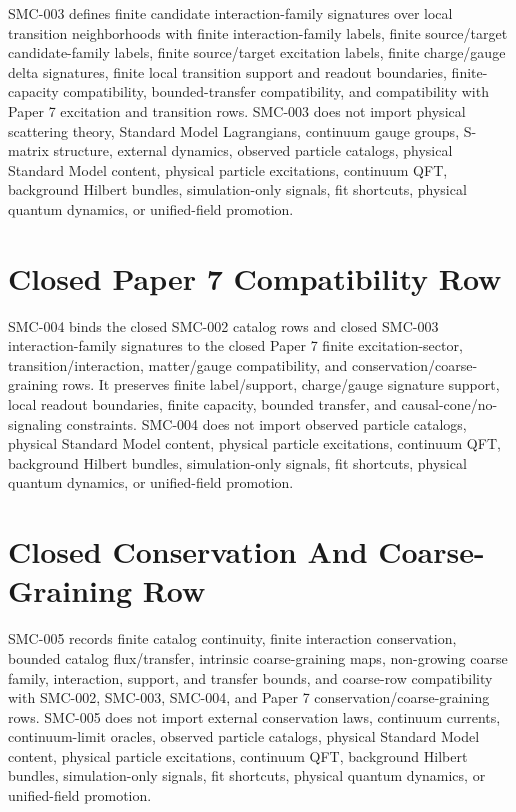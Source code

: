 \documentclass{article}
\begin{document}
SMC-003 defines finite candidate interaction-family signatures over local
transition neighborhoods with finite interaction-family labels, finite
source/target candidate-family labels, finite source/target excitation
labels, finite charge/gauge delta signatures, finite local transition support
and readout boundaries, finite-capacity compatibility, bounded-transfer
compatibility, and compatibility with Paper 7 excitation and transition rows.
SMC-003 does not import physical scattering theory, Standard Model
Lagrangians, continuum gauge groups, S-matrix structure, external dynamics,
observed particle catalogs, physical Standard Model content, physical
particle excitations, continuum QFT, background Hilbert bundles,
simulation-only signals, fit shortcuts, physical quantum dynamics, or
unified-field promotion.

\section{Closed Paper 7 Compatibility Row}

SMC-004 binds the closed SMC-002 catalog rows and closed SMC-003
interaction-family signatures to the closed Paper 7 finite excitation-sector,
transition/interaction, matter/gauge compatibility, and
conservation/coarse-graining rows. It preserves finite label/support,
charge/gauge signature support, local readout boundaries, finite capacity,
bounded transfer, and causal-cone/no-signaling constraints. SMC-004 does not
import observed particle catalogs, physical Standard Model content, physical
particle excitations, continuum QFT, background Hilbert bundles,
simulation-only signals, fit shortcuts, physical quantum dynamics, or
unified-field promotion.

\section{Closed Conservation And Coarse-Graining Row}

SMC-005 records finite catalog continuity, finite interaction conservation,
bounded catalog flux/transfer, intrinsic coarse-graining maps, non-growing
coarse family, interaction, support, and transfer bounds, and coarse-row
compatibility with SMC-002, SMC-003, SMC-004, and Paper 7
conservation/coarse-graining rows. SMC-005 does not import external
conservation laws, continuum currents, continuum-limit oracles, observed
particle catalogs, physical Standard Model content, physical particle
excitations, continuum QFT, background Hilbert bundles, simulation-only
signals, fit shortcuts, physical quantum dynamics, or unified-field
promotion.
\end{document}
